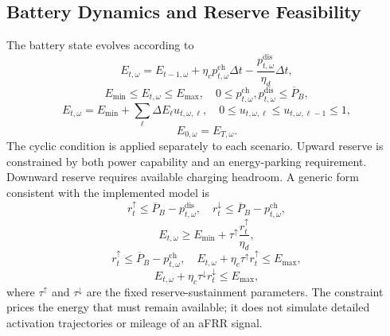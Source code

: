 \documentclass[journal,12pt,twocolumn]{IEEEtran}
\begin{document}
\subsection{Battery Dynamics and Reserve Feasibility}
The battery state evolves according to
\begin{equation}
E_{t,\omega} = E_{t-1,\omega} + \eta_c p_{t,\omega}^{\text{ch}} \Delta t - \frac{p_{t,\omega}^{\text{dis}}}{\eta_d} \Delta t,
\label{eq:battery}
\end{equation}
\begin{equation}
E_{\min} \leq E_{t,\omega} \leq E_{\max}, \quad 0 \leq p_{t,\omega}^{\text{ch}}, p_{t,\omega}^{\text{dis}} \leq \overline{P}_B,
\label{eq:soc}
\end{equation}
\begin{equation}
E_{t,\omega} = E_{\min} + \sum_{\ell} \Delta E_{\ell} u_{t,\omega,\ell}, \quad 0 \leq u_{t,\omega,\ell} \leq u_{t,\omega,\ell-1} \leq 1,
\label{eq:band}
\end{equation}
\begin{equation}
E_{0,\omega} = E_{T,\omega}.
\label{eq:cyclic}
\end{equation}
The cyclic condition is applied separately to each scenario. Upward reserve is constrained by both power capability and an energy-parking requirement. Downward reserve requires available charging headroom. A generic form consistent with the implemented model is
\begin{equation}
r_t^{\uparrow} \leq \overline{P}_B - p_{t,\omega}^{\text{dis}}, \quad r_t^{\downarrow} \leq \overline{P}_B - p_{t,\omega}^{\text{ch}},
\label{eq:reserve_power}
\end{equation}
\begin{equation}
E_{t,\omega} \geq E_{\min} + \tau^{\uparrow} \frac{r_t^{\uparrow}}{\eta_d},
\label{eq:reserve_energy}
\end{equation}
\begin{equation}
r_t^{\uparrow} \leq \overline{P}_B - p_{t,\omega}^{\text{ch}}, \quad E_{t,\omega} + \eta_c \tau^{\uparrow} r_t^{\uparrow} \leq E_{\max},
\label{eq:reserve_charge}
\end{equation}
\begin{equation}
E_{t,\omega} + \eta_c \tau^{\downarrow} r_t^{\downarrow} \leq E_{\max},
\label{eq:reserve_down}
\end{equation}
where $\tau^{\uparrow}$ and $\tau^{\downarrow}$ are the fixed reserve-sustainment parameters. The constraint prices the energy that must remain available; it does not simulate detailed activation trajectories or mileage of an aFRR signal.
\end{document}
